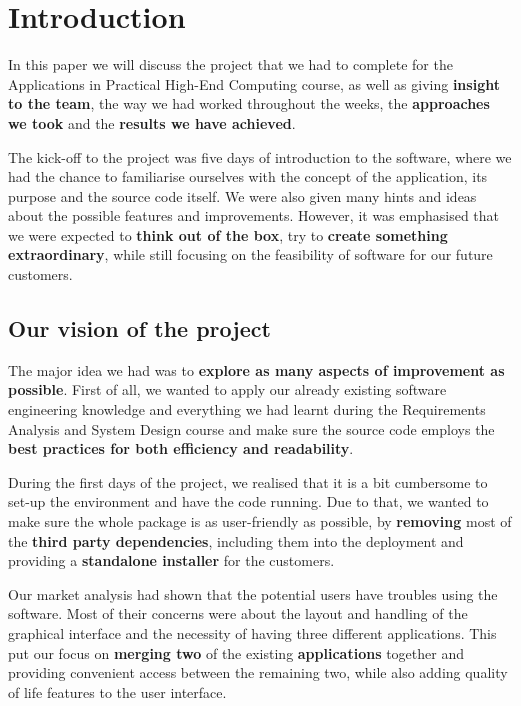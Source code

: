 \documentclass[a4paper, 11pt, article]{report}
\begin{document}

\tableofcontents
\newpage

\chapter{Introduction}

In this paper we will discuss the project that we had to complete for the Applications in Practical High-End Computing course, as well as giving \textbf{insight to the team}, the way we had worked throughout the weeks, the \textbf{approaches we took} and the \textbf{results we have achieved}.

The kick-off to the project was five days of introduction to the software, where we had the chance to familiarise ourselves with the concept of the application, its purpose and the source code itself. We were also given many hints and ideas about the possible features and improvements. However, it was emphasised that we were expected to \textbf{think out of the box}, try to \textbf{create something extraordinary}, while still focusing on the feasibility of software for our future customers.

\section{Our vision of the project}

The major idea we had was to \textbf{explore as many aspects of improvement as possible}. First of all, we wanted to apply our already existing software engineering knowledge and everything we had learnt during the Requirements Analysis and System Design course and make sure the source code employs the \textbf{best practices for both efficiency and readability}.

During the first days of the project, we realised that it is a bit cumbersome to set-up the environment and have the code running. Due to that, we wanted to make sure the whole package is as user-friendly as possible, by \textbf{removing} most of the \textbf{third party dependencies}, including them into the deployment and providing a \textbf{standalone installer} for the customers.

Our market analysis had shown that the potential users have troubles using the software. Most of their concerns were about the layout and handling of the graphical interface and the necessity of having three different applications. This put our focus on \textbf{merging two} of the existing \textbf{applications} together and providing convenient access between the remaining two, while also adding quality of life features to the user interface.
\end{document}
